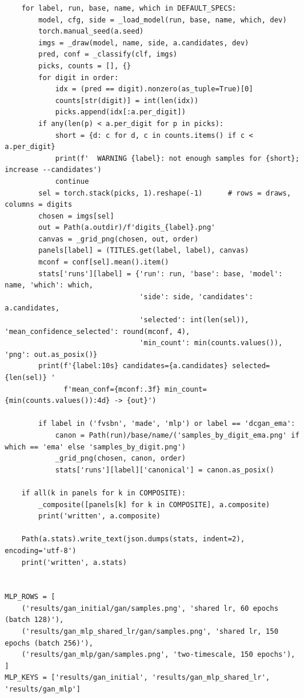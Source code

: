 \begin{lstlisting}
    for label, run, base, name, which in DEFAULT_SPECS:
        model, cfg, side = _load_model(run, base, name, which, dev)
        torch.manual_seed(a.seed)
        imgs = _draw(model, name, side, a.candidates, dev)
        pred, conf = _classify(clf, imgs)
        picks, counts = [], {}
        for digit in order:
            idx = (pred == digit).nonzero(as_tuple=True)[0]
            counts[str(digit)] = int(len(idx))
            picks.append(idx[:a.per_digit])
        if any(len(p) < a.per_digit for p in picks):
            short = {d: c for d, c in counts.items() if c < a.per_digit}
            print(f'  WARNING {label}: not enough samples for {short}; increase --candidates')
            continue
        sel = torch.stack(picks, 1).reshape(-1)      # rows = draws, columns = digits
        chosen = imgs[sel]
        out = Path(a.outdir)/f'digits_{label}.png'
        canvas = _grid_png(chosen, out, order)
        panels[label] = (TITLES.get(label, label), canvas)
        mconf = conf[sel].mean().item()
        stats['runs'][label] = {'run': run, 'base': base, 'model': name, 'which': which,
                                'side': side, 'candidates': a.candidates,
                                'selected': int(len(sel)), 'mean_confidence_selected': round(mconf, 4),
                                'min_count': min(counts.values()), 'png': out.as_posix()}
        print(f'{label:10s} candidates={a.candidates} selected={len(sel)} '
              f'mean_conf={mconf:.3f} min_count={min(counts.values()):4d} -> {out}')

        if label in ('fvsbn', 'made', 'mlp') or label == 'dcgan_ema':
            canon = Path(run)/base/name/('samples_by_digit_ema.png' if which == 'ema' else 'samples_by_digit.png')
            _grid_png(chosen, canon, order)
            stats['runs'][label]['canonical'] = canon.as_posix()

    if all(k in panels for k in COMPOSITE):
        _composite([panels[k] for k in COMPOSITE], a.composite)
        print('written', a.composite)

    Path(a.stats).write_text(json.dumps(stats, indent=2), encoding='utf-8')
    print('written', a.stats)


MLP_ROWS = [
    ('results/gan_initial/gan/samples.png', 'shared lr, 60 epochs (batch 128)'),
    ('results/gan_mlp_shared_lr/gan/samples.png', 'shared lr, 150 epochs (batch 256)'),
    ('results/gan_mlp/gan/samples.png', 'two-timescale, 150 epochs'),
]
MLP_KEYS = ['results/gan_initial', 'results/gan_mlp_shared_lr', 'results/gan_mlp']



\end{lstlisting}

